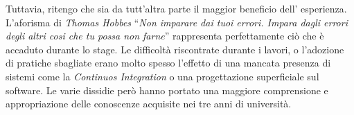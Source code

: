 Tuttavia, ritengo che sia da tutt'altra parte il maggior beneficio dell'
esperienza. L'aforisma di \textit{Thomas Hobbes} ``\textit{Non imparare dai tuoi
errori. Impara dagli errori degli altri cosi che tu possa non farne}'' 
rappresenta perfettamente ciò che è accaduto durante lo stage. Le difficoltà 
riscontrate durante i lavori, o l'adozione di pratiche sbagliate erano molto 
spesso l'effetto di una mancata presenza di sistemi come la \textit{Continuos
Integration} o una progettazione superficiale sul software. Le varie dissidie
però hanno portato una maggiore comprensione e appropriazione delle conoscenze
acquisite nei tre anni di università.







